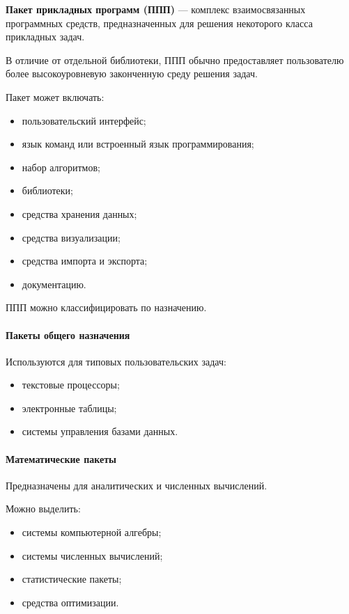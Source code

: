 \textbf{Пакет прикладных программ (ППП)} --- комплекс взаимосвязанных программных средств, предназначенных для решения некоторого класса прикладных задач.

В отличие от отдельной библиотеки, ППП обычно предоставляет пользователю более высокоуровневую законченную среду решения задач.

Пакет может включать:
\begin{itemize}
	\item пользовательский интерфейс;
	\item язык команд или встроенный язык программирования;
	\item набор алгоритмов;
	\item библиотеки;
	\item средства хранения данных;
	\item средства визуализации;
	\item средства импорта и экспорта;
	\item документацию.
\end{itemize}

ППП можно классифицировать по назначению.

\paragraph{Пакеты общего назначения}

Используются для типовых пользовательских задач:
\begin{itemize}
	\item текстовые процессоры;
	\item электронные таблицы;
	\item системы управления базами данных.
\end{itemize}

\paragraph{Математические пакеты}

Предназначены для аналитических и численных вычислений.

Можно выделить:
\begin{itemize}
	\item системы компьютерной алгебры;
	\item системы численных вычислений;
	\item статистические пакеты;
	\item средства оптимизации.
\end{itemize}

